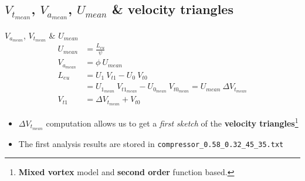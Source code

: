 	\subsection{$V_{t_{mean}}$, $V_{a_{mean}}$, $U_{mean}$ \& velocity triangles}
\begin{frame}[fragile]{$V_{a_{mean}}$, $V_{t_{mean}}$ \& $U_{mean}$}
	\begin{align}
		U_{mean} & = \frac{L_{eu}}{\psi} \nonumber \\ 
		V_{a_{mean}} & = \phi \ U_{mean} \nonumber \\
		L_{eu} & = U_1 \ V_{t1} - U_0 \ V_{t0} \nonumber \\ 
		       & = U_{1_{mean}} \ V_{t1_{mean}} - U_{0_{mean}} \ V_{t0_{mean}} = U_{mean} \ \Delta V_{t_{mean}} \nonumber \\
		V_{t1} & = \Delta V_{t_{mean}} + V_{t0} \nonumber  
	\end{align}
	\begin{itemize}
		\item $\Delta V_{t_{mean}}$ computation allows us to get a \textit{first sketch} of the \textbf{velocity triangles}\footnote{\textbf{Mixed vortex} model and \textbf{second order} function based.}
		\item The first analysis results are stored in \verb|compressor_0.58_0.32_45_35.txt|
	\end{itemize}
\end{frame}
